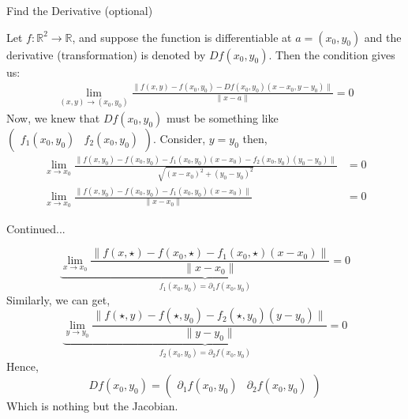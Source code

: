 \documentclass[11pt]{beamer}
\theoremstyle{plain}
\begin{document}
\begin{frame}{Find the Derivative (optional)}
    \begin{example}
        Let $f:\mathbb R^2\rightarrow\mathbb R$, and suppose the function is differentiable at $a=(x_0,y_0)$ and the derivative (transformation) is denoted by $Df(x_0,y_0)$. Then the condition gives us:
        \begin{align*}
           \lim_{(x,y)\rightarrow(x_0,y_0)}  \frac{\| f(x,y)-f(x_0,y_0)-Df(x_0,y_0)(x-x_0,y-y_0)\|}{\|x-a\|}=0
        \end{align*}
        Now, we knew that $Df(x_0,y_0)$ must be something like $\begin{pmatrix}
            f_1(x_0,y_0)&f_2(x_0,y_0)
        \end{pmatrix}$. Consider, $y=y_0$ then, 
        \begin{align*}
            \lim_{x\rightarrow x_0}  \frac{\| f(x,y_0)-f(x_0,y_0)-f_1(x_0,y_0)(x-x_0)-f_2(x_0,y_0)(y_0-y_0)\|}{\sqrt{(x-x_0)^2+(y_0-y_0)^2}}&=0\\
            \lim_{x\rightarrow x_0}  \frac{\| f(x,y_0)-f(x_0,y_0)-f_1(x_0,y_0)(x-x_0)\|}{\|x-x_0\|}&=0
        \end{align*}
    \end{example}
\end{frame}
\begin{frame}{Continued...}
    \begin{example}
            $$
            \underbrace{\lim_{x\rightarrow x_0}  \frac{\| f(x,\star)-f(x_0,\star)-f_1(x_0,\star)(x-x_0)\|}{\|x-x_0\|}=0}_{f_1(x_0,y_0)=\partial_1f(x_0,y_0)}
            $$
            Similarly, we can get, 
            $$
            \underbrace{\lim_{y\rightarrow y_0}  \frac{\| f(\star,y)-f(\star,y_0)-f_2(\star,y_0)(y-y_0)\|}{\|y-y_0\|}=0}_{f_2(x_0,y_0)=\partial_2f(x_0,y_0)}
            $$
            Hence, 
            $$Df(x_0,y_0)=\begin{pmatrix}
                \partial_1 f(x_0,y_0)&\partial_2 f(x_0,y_0)
            \end{pmatrix}$$
            Which is nothing but the Jacobian. 
    \end{example}
\end{frame}
\end{document}
